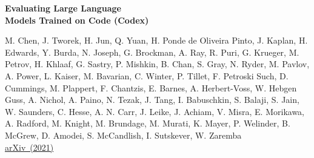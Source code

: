 \documentclass[aspectratio=43,9pt]{beamer}
\newcommand{\reflink}[2]{\href{#1}{\mbox{#2}}}
\begin{document}
\begin{frame}[plain]
\centering
\vspace{4.35em}
{\fontsize{25}{27}\selectfont\bfseries Evaluating Large Language\\[0.25em]Models Trained on Code (Codex)\par}
\vspace{2.1em}
{\tiny
M. Chen, J. Tworek, H. Jun, Q. Yuan, H. Ponde de Oliveira Pinto, J. Kaplan, H. Edwards, Y. Burda, N. Joseph, G. Brockman, A. Ray, R. Puri, G. Krueger, M. Petrov, H. Khlaaf, G. Sastry, P. Mishkin, B. Chan, S. Gray, N. Ryder, M. Pavlov, A. Power, L. Kaiser, M. Bavarian, C. Winter, P. Tillet, F. Petroski Such, D. Cummings, M. Plappert, F. Chantzis, E. Barnes, A. Herbert-Voss, W. Hebgen Guss, A. Nichol, A. Paino, N. Tezak, J. Tang, I. Babuschkin, S. Balaji, S. Jain, W. Saunders, C. Hesse, A. N. Carr, J. Leike, J. Achiam, V. Misra, E. Morikawa, A. Radford, M. Knight, M. Brundage, M. Murati, K. Mayer, P. Welinder, B. McGrew, D. Amodei, S. McCandlish, I. Sutskever, W. Zaremba\\[0.3em]
\reflink{https://arxiv.org/abs/2107.03374}{arXiv (2021)}}
\vfill
\end{frame}
\end{document}
